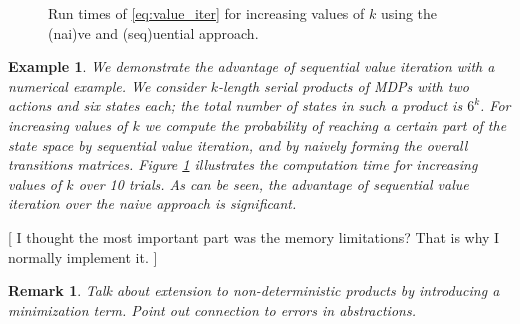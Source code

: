 \documentclass[conference]{IEEEtran}
\newlength\figureheight
\newlength\figurewidth
\newtheorem{remark}{Remark}
\newtheorem{example}{Example}
\newcommand{\red}[1]{{\color{red} #1 }}
\newcommand{\sofie}[1]{{\color{orange}[ #1 ]}}
\begin{document}
  \begin{figure}[h]
    \setlength{} 
    \setlength{} 
    \begin{center}
    
    \end{center}
    \caption{Run times of \eqref{eq:value_iter} for increasing values of $k$ using the (nai)ve and (seq)uential approach.}
    \label{fig:scalability}
  \end{figure}
\begin{example}
  We demonstrate the advantage of sequential value iteration with a numerical example. We consider $k$-length serial products of MDPs with two actions and six states each; the total number of states in such a product is $6^k$. For increasing values of $k$ we compute the probability of reaching a certain part of the state space by sequential value iteration, and by naively forming the overall transitions matrices. Figure \ref{fig:scalability} illustrates the computation time for increasing values of $k$ over 10 trials. As can be seen, the advantage of sequential value iteration over the naive approach is significant.
\end{example}
\sofie{I thought the most important part was the memory limitations? That is why I normally implement it.}

\begin{remark}
  \red{Talk about extension to non-deterministic products by introducing a minimization term. Point out connection to errors in abstractions.} 
\end{remark}


\end{document}
